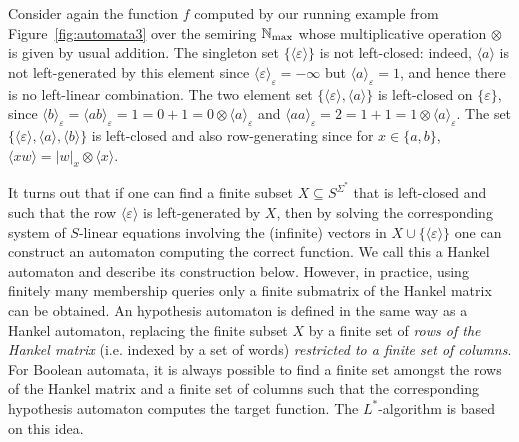 \documentclass{lmcs}
\numberwithin{theorem}{section}
\begin{document}
\begin{exa}
Consider again the function $f$ computed by our running example from Figure~\ref{fig:automata3} over the semiring $\mathbb{N}_{\rm max}$ whose multiplicative operation $\otimes$ is given by usual addition. The singleton set $\{\langle \varepsilon \rangle\}$ is not left-closed: indeed, $\langle a \rangle$ is not left-generated by this element since $\langle \varepsilon \rangle_\varepsilon = -\infty$ but $\langle a \rangle_\varepsilon = 1$, and hence there is no left-linear combination. The two element set $\{\langle \varepsilon \rangle, \langle a \rangle\}$ is left-closed  on $\{\varepsilon\}$, since $\langle b \rangle_\varepsilon =  \langle ab \rangle_\varepsilon = 1 = 0+1 = 0 \otimes \langle a \rangle_\varepsilon$ and $\langle aa \rangle_\varepsilon = 2 = 1+1 = 1 \otimes \langle a \rangle_\varepsilon$. The set $\{\langle \varepsilon \rangle, \langle a \rangle, \langle b \rangle \}$ is left-closed  and also row-generating since for $x \in \{a,b\}$, $\langle xw \rangle = |w|_x \otimes \langle x \rangle$.
\end{exa}

It turns out that if one can find a finite  subset  $X \subseteq S^{\Sigma^*}$ that is left-closed and such that the row $\langle \varepsilon \rangle$ is left-generated by $X$, then by solving the corresponding system of $S$-linear equations involving the (infinite) vectors in $X \cup \{\langle \varepsilon\rangle\}$ one can construct an automaton computing the correct function. We call this a Hankel automaton and describe its construction below. However, in practice, using finitely many membership queries only a finite submatrix of the Hankel matrix can be obtained. An hypothesis automaton is defined in the same way as a Hankel automaton, replacing the finite subset $X$ by a finite set of \emph{rows of the Hankel matrix} (i.e. indexed by a set of words) \emph{restricted to a finite set of columns}. For Boolean automata, it is always possible to find a finite set amongst the rows of the Hankel matrix and a finite set of columns such that the corresponding hypothesis automaton computes the target function. The $L^*$-algorithm is based on this idea. 
\end{document}
